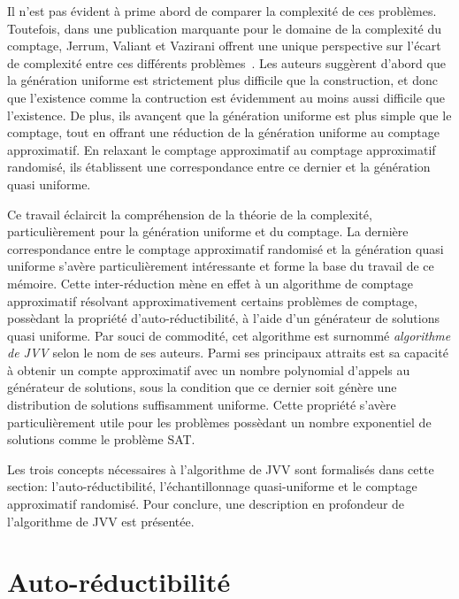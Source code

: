 Il n'est pas évident à prime abord de comparer la complexité de ces problèmes. Toutefois, dans une publication marquante pour le domaine de la complexité du comptage, Jerrum, Valiant et Vazirani offrent une unique perspective sur l'écart de complexité entre ces différents problèmes~\cite{jerrumRandomGenerationCombinatorial1986}. Les auteurs suggèrent d'abord que la génération uniforme est strictement plus difficile que la construction, et donc que l'existence comme la contruction est évidemment au moins aussi difficile que l'existence. De plus, ils avançent que la génération uniforme est plus simple que le comptage, tout en offrant une réduction de la génération uniforme au comptage approximatif. En relaxant le comptage approximatif au comptage approximatif randomisé, ils établissent une correspondance entre ce dernier et la génération quasi uniforme.

Ce travail éclaircit la compréhension de la théorie de la complexité, particulièrement pour la génération uniforme et du comptage. La dernière correspondance entre le comptage approximatif randomisé et la génération quasi uniforme s'avère particulièrement intéressante et forme la base du travail de ce mémoire. Cette inter-réduction mène en effet à un algorithme de comptage approximatif résolvant approximativement certains problèmes de comptage, possèdant la propriété d'auto-réductibilité, à l'aide d'un générateur de solutions quasi uniforme. Par souci de commodité, cet algorithme est surnommé \textit{algorithme de JVV} selon le nom de ses auteurs. Parmi ses principaux attraits est sa capacité à obtenir un compte approximatif avec un nombre polynomial d'appels au générateur de solutions, sous la condition que ce dernier soit génère une distribution de solutions suffisamment uniforme. Cette propriété s'avère particulièrement utile pour les problèmes possèdant un nombre exponentiel de solutions comme le problème SAT.

Les trois concepts nécessaires à l'algorithme de JVV sont formalisés dans cette section: l'auto-réductibilité, l'échantillonnage quasi-uniforme et le comptage approximatif randomisé. Pour conclure, une description en profondeur de l'algorithme de JVV est présentée.


\section{Auto-réductibilité}
\label{sec:auto-reductibilite}
 
